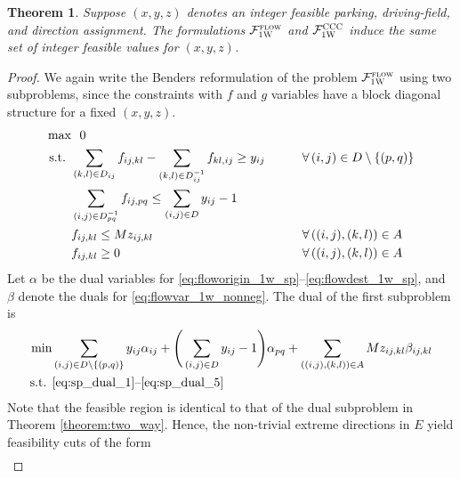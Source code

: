 \documentclass[10pt]{article}
\newcommand{\drivevar}[2]{y_{#1#2}}
\newcommand{\flowvar}[4]{f_{#1#2,#3#4}}
\newcommand{\countvar}[4]{z_{#1#2,#3#4}}
\newcommand{\validdriveset}{D}
\newcommand{\gridadjset}[2]{D_{#1#2}}
\newcommand{\gridinvadjset}[2]{D^{-1}_{#1#2}}
\newcommand{\gridarcset}{A}
\newcommand{\entrancex}{p}
\newcommand{\entrancey}{q}
\newtheorem{theorem}{Theorem}
\theoremstyle{definition}
\begin{document}
\begin{theorem}
Suppose $(x, y, z)$ denotes an integer feasible parking, driving-field, and direction assignment. The formulations $\mathcal{F}_{\textsc{1W}}^{\textsc{flow}}$ and $\mathcal{F}_{\textsc{1W}}^{\textsc{CCC}}$ induce the same set of integer feasible values for $(x,y,z)$.
\end{theorem}
\begin{proof}
We again write the Benders reformulation of the problem $\mathcal{F}_{\textsc{1W}}^{\textsc{flow}}$ using two subproblems, since the constraints with $f$ and $g$ variables have a block diagonal structure for a fixed $(x, y, z)$. 
\begin{align}
    \max & \, \, \, \, 0  && \notag \\
      \text{s.t. }  & \sum_{(k,l) \in \gridadjset{i}{j}} \flowvar{i}{j}{k}{l} - \sum_{(k,l) \in \gridinvadjset{i}{j}} \flowvar{k}{l}{i}{j} \geq \drivevar{i}{j} \qquad && \forall \, (i,j) \in \validdriveset \setminus \{(\entrancex, \entrancey)\} \label{eq:floworigin_1w_sp}\\
     & \sum_{(i,j) \in \gridinvadjset{\entrancex}{\entrancey}} \flowvar{i}{j}{\entrancex}{\entrancey} \leq \sum_{(i,j) \in \validdriveset} \drivevar{i}{j} -1 \qquad &&  \label{eq:flowdest_1w_sp}\\
    & \flowvar{i}{j}{k}{l} \leq M \countvar{i}{j}{k}{l} \qquad && \forall \, ((i,j), (k,l)) \in \gridarcset \label{eq:flowhead_1w_sp} \\
    & \flowvar{i}{j}{k}{l} \geq 0 \qquad && \forall \, ((i,j), (k,l)) \in \gridarcset \label{eq:flowvar_1w_nonneg}
\end{align}
Let $\alpha$ be the dual variables for \eqref{eq:floworigin_1w_sp}--\eqref{eq:flowdest_1w_sp}, and $\beta$ denote the duals for \eqref{eq:flowvar_1w_nonneg}. The dual of the first subproblem is
\begin{align}
    \min & \sum_{(i,j) \in \validdriveset \setminus \{(\entrancex, \entrancey)\}} \drivevar{i}{j} \alpha_{ij} + \Bigg(\sum_{(i,j) \in \validdriveset} \drivevar{i}{j} -1 \Bigg) \alpha_{pq} + \sum_{((i,j), (k,l)) \in \gridarcset}  M \countvar{i}{j}{k}{l} \beta_{ij, kl}  \\
    \text{s.t. } & \eqref{eq:sp_dual_1} \text{--} \eqref{eq:sp_dual_5}
\end{align}
Note that the feasible region is identical to that of the dual subproblem in Theorem \ref{theorem:two_way}. Hence, the non-trivial extreme directions in $E$ yield feasibility cuts of the form
\begin{align}

\end{align}
\end{proof}
\end{document}
